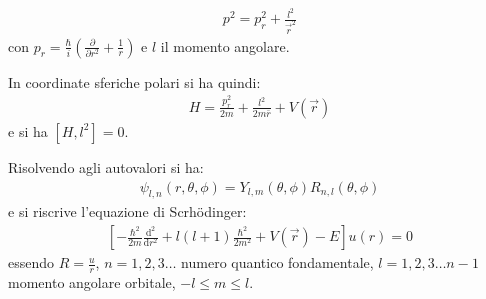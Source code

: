 \documentclass[a4paper,11pt,twoside,openany]{book}
\theoremstyle{definition}
\theoremstyle{plain}
\theoremstyle{plain}
\theoremstyle{definition}
\begin{document}
\begin{equation}\begin{split}
p^2=p_r^2+\frac{l^2}{\vec r^2}
\end{split}\end{equation}
con $p_r=\frac{\hbar }{i}\left(\frac{\partial }{\partial r^2}+\frac{1}{r}\right)$ e $l$ il momento angolare.

In coordinate sferiche polari si ha quindi:
\begin{equation}\begin{split}
H=\frac{p_r^2}{2m}+\frac{l^2}{2m\bar r}+V\left(\vec r\right)
\end{split}\end{equation}
e si ha $\left[H,l^2\right]=0$.

Risolvendo agli autovalori si ha:
\begin{equation}\begin{split}
\psi _{l,n}\left(r,\theta,\phi\right)=Y_{l,m}\left(\theta,\phi\right)R_{n,l}\left(\theta,\phi\right)
\end{split}\end{equation}
e si riscrive l'equazione di Scrhödinger:
\begin{equation}\begin{split}
\left[-\frac{\hbar ^2}{2m}\frac{\textrm{d}^2}{\textrm{d}r^2}+l\left(l+1\right)\frac{\hbar ^2}{2m^2}+V\left(\vec r\right)-E\right]u\left(r\right)=0
\end{split}\end{equation}
essendo $R=\frac{u}{r}$, $n=1,2,3\dots$ numero quantico fondamentale, $l=1,2,3\dots n-1$ momento angolare orbitale, $-l\le m\le l$.
\end{document}
